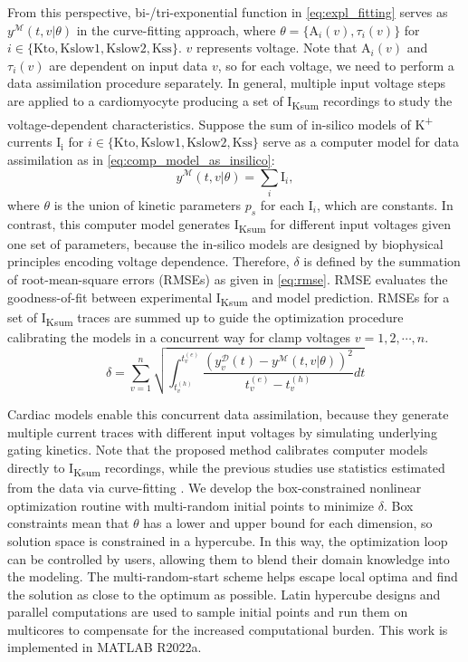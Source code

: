 \documentclass[11pt]{article}
\begin{document}
From this perspective, bi-/tri-exponential function in \eqref{eq:expl_fitting} serves as $y^{\mathcal{M}}(t,v|\theta)$ in the curve-fitting approach, where $\theta=\{\mathrm{A}_{i}(v),\tau_{i}(v)\}$ for $i \in \{\mathrm{Kto}, \mathrm{Kslow1}, \mathrm{Kslow2}, \mathrm{Kss}\}$. $v$ represents voltage. Note that $\mathrm{A}_{i}(v)$ and $\tau_{i}(v)$ are dependent on input data $v$, so for each voltage, we need to perform a data assimilation procedure separately. In general, multiple input voltage steps are applied to a cardiomyocyte producing a set of I\textsubscript{Ksum} recordings to study the voltage-dependent characteristics. Suppose the sum of in-silico models of K\textsuperscript{+} currents $\mathrm{I}_\mathrm{i}$ for $i \in \{\mathrm{Kto}, \mathrm{Kslow1}, \mathrm{Kslow2}, \mathrm{Kss}\}$ serve as a computer model for data assimilation as in \eqref{eq:comp_model_as_insilico}:
\begin{equation}
    \label{eq:comp_model_as_insilico}
    y^{\mathcal{M}}(t,v|\theta) = \sum_{i} \mathrm{I}_{i},
\end{equation}
where $\theta$ is the union of kinetic parameters $p_{s}$ for each $\mathrm{I}_{i}$, which are constants. In contrast, this computer model generates I\textsubscript{Ksum} for different input voltages given one set of parameters, because the in-silico models are designed by biophysical principles encoding voltage dependence. Therefore, $\delta$ is defined by the summation of root-mean-square errors (RMSEs) as given in \eqref{eq:rmse}. RMSE evaluates the goodness-of-fit between experimental I\textsubscript{Ksum} and model prediction. RMSEs for a set of I\textsubscript{Ksum} traces are summed up to guide the optimization procedure calibrating the models in a concurrent way for clamp voltages $v=1,2,\cdots,n$.
\begin{equation}
    \label{eq:rmse}
    \delta = \sum_{v=1}^{n} \sqrt{\int_{t_v^{(h)}}^{t_v^{(e)}}\frac{(y_v^{\mathcal{D}}(t) - y^{\mathcal{M}}(t,v|\theta))^2}{t_v^{(e)}-t_v^{(h)}}dt}
\end{equation}

Cardiac models enable this concurrent data assimilation, because they generate multiple current traces with different input voltages by simulating underlying gating kinetics. Note that the proposed method calibrates computer models directly to I\textsubscript{Ksum} recordings, while the previous studies use statistics estimated from the data via curve-fitting \citep{du2013silico,du2015statistical,du2017silico,kim2022simulation}. We develop the box-constrained nonlinear optimization routine with multi-random initial points to minimize $\delta$. Box constraints mean that $\theta$ has a lower and upper bound for each dimension, so solution space is constrained in a hypercube. In this way, the optimization loop can be controlled by users, allowing them to blend their domain knowledge into the modeling. The multi-random-start scheme helps escape local optima and find the solution as close to the optimum as possible. Latin hypercube designs and parallel computations are used to sample initial points and run them on multicores to compensate for the increased computational burden. This work is implemented in MATLAB R2022a.
\end{document}
